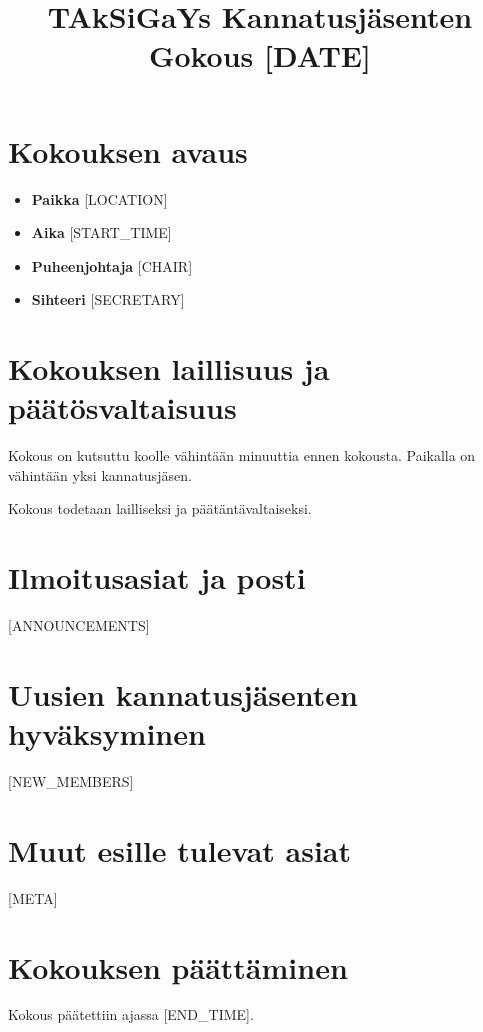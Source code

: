 \documentclass[12pt]{article}
\title{TAkSiGaYs Kannatusjäsenten Gokous [DATE]} %
\author{}
\begin{document}
\maketitle
 
\tableofcontents

\section{Kokouksen avaus}

\begin{itemize}
	\item{\textbf{Paikka} [LOCATION]} %
	\item{\textbf{Aika} [START_TIME]} %
	\item{\textbf{Puheenjohtaja} [CHAIR]} %
	\item{\textbf{Sihteeri} [SECRETARY]} %
\end{itemize}

\section{Kokouksen laillisuus ja päätösvaltaisuus}

Kokous on kutsuttu koolle vähintään minuuttia ennen kokousta.
Paikalla on vähintään yksi kannatusjäsen.

Kokous todetaan lailliseksi ja päätäntävaltaiseksi.

\section{Ilmoitusasiat ja posti}
[ANNOUNCEMENTS]

\section{Uusien kannatusjäsenten hyväksyminen}
[NEW_MEMBERS]

\section{Muut esille tulevat asiat}
[META]

\section{Kokouksen päättäminen}
Kokous päätettiin ajassa [END_TIME]. %
\end{document}
